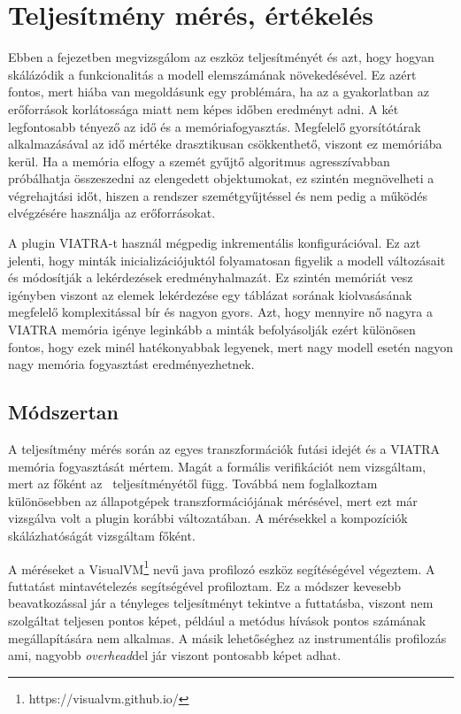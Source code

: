 \chapter{Teljesítmény mérés, értékelés}

Ebben a fejezetben megvizsgálom az eszköz teljesítményét és azt, hogy hogyan skálázódik a funkcionalitás a modell elemszámának növekedésével. Ez azért fontos, mert  hiába van megoldásunk egy problémára, ha az a gyakorlatban az erőforrások korlátossága miatt nem képes időben eredményt adni. A két legfontosabb tényező az idő és a memóriafogyasztás. Megfelelő gyorsítótárak alkalmazásával az idő mértéke drasztikusan csökkenthető, viszont ez memóriába kerül. Ha a memória elfogy a szemét gyűjtő algoritmus agresszívabban próbálhatja összeszedni az elengedett objektumokat, ez szintén megnövelheti a végrehajtási időt, hiszen a rendszer szemétgyűjtéssel és nem pedig a működés elvégzésére használja az erőforrásokat.

A plugin VIATRA-t használ mégpedig inkrementális konfigurációval. Ez azt jelenti, hogy minták inicializációjuktól folyamatosan figyelik a modell változásait és módosítják a lekérdezések eredményhalmazát. Ez szintén memóriát vesz igényben viszont az elemek lekérdezése egy táblázat sorának kiolvasásának megfelelő komplexitással bír és nagyon gyors. Azt, hogy mennyire nő nagyra a VIATRA memória igénye leginkább a minták befolyásolják ezért különösen fontos, hogy ezek minél hatékonyabbak legyenek, mert nagy modell esetén nagyon nagy memória fogyasztást eredményezhetnek.

\section{Módszertan}

A teljesítmény mérés során az egyes transzformációk futási idejét és a VIATRA memória fogyasztását mértem. Magát a formális verifikációt  nem vizsgáltam, mert az főként az \uppaal\ teljesítményétől függ. Továbbá nem foglalkoztam különösebben az állapotgépek transzformációjának mérésével, mert ezt már vizsgálva volt a plugin korábbi változatában. A mérésekkel a kompozíciók skálázhatóságát vizsgáltam főként.

A méréseket a VisualVM\footnote{https://visualvm.github.io/} nevű java profilozó eszköz segítéségével végeztem. A futtatást mintavételezés segítségével profiloztam. Ez a módszer kevesebb beavatkozással jár a tényleges teljesítményt tekintve a futtatásba, viszont nem szolgáltat teljesen pontos képet, például a metódus hívások pontos számának megállapítására nem alkalmas. A másik lehetőséghez az instrumentális profilozás ami, nagyobb \emph{overhead}del jár viszont pontosabb képet adhat.

